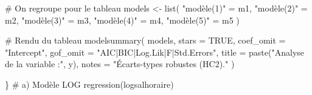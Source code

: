 \documentclass[
  letterpaper,
  DIV=11,
  numbers=noendperiod]{scrartcl}
\newenvironment{Shaded}{\begin{snugshade}}{\end{snugshade}}
\newcommand{\AttributeTok}[1]{\textcolor[rgb]{0.40,0.45,0.13}{#1}}
\newcommand{\CommentTok}[1]{\textcolor[rgb]{0.37,0.37,0.37}{#1}}
\newcommand{\ConstantTok}[1]{\textcolor[rgb]{0.56,0.35,0.01}{#1}}
\newcommand{\FunctionTok}[1]{\textcolor[rgb]{0.28,0.35,0.67}{#1}}
\newcommand{\NormalTok}[1]{\textcolor[rgb]{0.00,0.23,0.31}{#1}}
\newcommand{\OtherTok}[1]{\textcolor[rgb]{0.00,0.23,0.31}{#1}}
\newcommand{\StringTok}[1]{\textcolor[rgb]{0.13,0.47,0.30}{#1}}
\begin{document}
\begin{Shaded}
\begin{Highlighting}[]
  \CommentTok{\# On regroupe pour le tableau}
\NormalTok{  models }\OtherTok{\textless{}{-}} \FunctionTok{list}\NormalTok{(}
    \StringTok{"modèle(1)"} \OtherTok{=}\NormalTok{ m1, }
    \StringTok{"modèle(2)"} \OtherTok{=}\NormalTok{ m2, }
    \StringTok{"modèle(3)"} \OtherTok{=}\NormalTok{ m3, }
    \StringTok{"modèle(4)"} \OtherTok{=}\NormalTok{ m4, }
    \StringTok{"modèle(5)"} \OtherTok{=}\NormalTok{ m5}
\NormalTok{  )}
  
  \CommentTok{\# Rendu du tableau}
  \FunctionTok{modelsummary}\NormalTok{(}
\NormalTok{    models,}
    \AttributeTok{stars =} \ConstantTok{TRUE}\NormalTok{,}
    \AttributeTok{coef\_omit =} \StringTok{"Intercept"}\NormalTok{,}
    \AttributeTok{gof\_omit =} \StringTok{"AIC|BIC|Log.Lik|F|Std.Errors"}\NormalTok{,}
    \AttributeTok{title =} \FunctionTok{paste}\NormalTok{(}\StringTok{"Analyse de la variable :"}\NormalTok{, y),}
    \AttributeTok{notes =} \StringTok{"Écarts{-}types robustes (HC2)."}
\NormalTok{  )}
  
\NormalTok{\}}
  \CommentTok{\# a) Modèle LOG }
\FunctionTok{regression}\NormalTok{(logsalhoraire)}
\end{Highlighting}
\end{Shaded}
\end{document}
